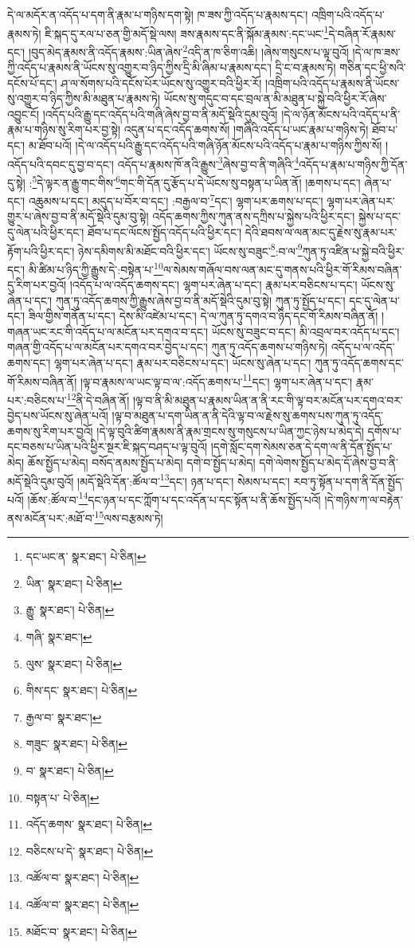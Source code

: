 དེ་ལ་མདོར་ན་འདོད་པ་དག་ནི་རྣམ་པ་གཉིས་དག་སྟེ། ཁ་ཟས་ཀྱི་འདོད་པ་རྣམས་དང་། འཁྲིག་པའི་འདོད་པ་རྣམས་ཏེ། ཇི་སྐད་དུ་རལ་པ་ཅན་གྱི་མདོ་སྡེ་ལས། ཟས་རྣམས་དང་ནི་སྐོམ་རྣམས་:དང་ཡང་\footnote{དང་ཡང་ན་  སྣར་ཐང་།  པེ་ཅིན། }དེ་བཞིན་རོ་རྣམས་དང་། །བུད་མེད་རྣམས་ནི་འདོད་རྣམས་:ཡིན་ཞེས་\footnote{ཡིན་  སྣར་ཐང་།  པེ་ཅིན། }འདི་ན་ཁ་ཅིག་འཆི། །ཞེས་གསུངས་པ་ལྟ་བུའོ། །དེ་ལ་ཁ་ཟས་ཀྱི་འདོད་པ་རྣམས་ནི་ཡོངས་སུ་འགྱུར་བ་ཉིད་ཀྱིས་དྲི་མི་ཞིམ་པ་རྣམས་དང་། དྲི་ང་བ་རྣམས་ཏེ། གཅིན་དང་ཕྱི་སའི་དངོས་པོ་དང་། ཤ་ལ་སོགས་པའི་དངོས་པོར་ཡོངས་སུ་འགྱུར་བའི་ཕྱིར་རོ། །འཁྲིག་པའི་འདོད་པ་རྣམས་ནི་ཡོངས་སུ་འགྱུར་བ་ཉིད་ཀྱིས་མི་མཐུན་པ་རྣམས་ཏེ། ཡོངས་སུ་གདུང་བ་དང་བྲལ་ན་མི་མཐུན་པ་སྐྱེ་བའི་ཕྱིར་རོ་ཞེས་འབྱུང་ངོ། །འདོད་པའི་རྒྱུ་དང་འདོད་པའི་གཞི་ཞེས་བྱ་བ་ནི་མདོ་སྡེའི་དུམ་བུའོ། །དེ་ལ་ཉོན་མོངས་པའི་འདོད་པ་ནི་རྣམ་པ་གཉིས་སུ་རིག་པར་བྱ་སྟེ། འདུན་པ་དང་འདོད་ཆགས་སོ། །གཞིའི་འདོད་པ་ཡང་རྣམ་པ་གཉིས་ཏེ། ཐོབ་པ་དང་། མ་ཐོབ་པའོ། །དེ་ལ་འདོད་པའི་རྒྱུ་དང་འདོད་པའི་གཞི་ཉོན་མོངས་པའི་འདོད་པ་རྣམ་པ་གཉིས་ཀྱིས་སོ། །འདོད་པའི་དབང་དུ་བྱ་བ་དང་། འདོད་པ་རྣམས་ཁོ་ནའི་རྒྱུས་\footnote{རྒྱུ་  སྣར་ཐང་།  པེ་ཅིན། }ཞེས་བྱ་བ་ནི་གཞིའི་\footnote{གཞི་  སྣར་ཐང་། }འདོད་པ་རྣམ་པ་གཉིས་ཀྱི་དོན་དུ་སྟེ། :\footnote{ལུས་  སྣར་ཐང་།  པེ་ཅིན། }དེ་ལྟར་ན་རྒྱུ་གང་གིས་\footnote{གིས་དང་  སྣར་ཐང་།  པེ་ཅིན། }གང་གི་དོན་དུ་རྩོད་པ་དེ་ཡོངས་སུ་བསྟན་པ་ཡིན་ནོ། །ཆགས་པ་དང་། ཞེན་པ་དང་། འཆུམས་པ་དང་། མདུད་པ་བོར་བ་དང་། :བརྒྱལ་བ་\footnote{རྒྱལ་བ་  སྣར་ཐང་། }དང་། ལྷག་པར་ཆགས་པ་དང་། ལྷག་པར་ཞེན་པར་གྱུར་པ་ཞེས་བྱ་བ་ནི་མདོ་སྡེའི་དུམ་བུ་སྟེ། འདོད་ཆགས་ཀྱིས་ཀུན་ནས་དཀྲིས་པ་སྐྱེས་པའི་ཕྱིར་དང་། སྐྱེས་པ་དང་དུ་ལེན་པའི་ཕྱིར་དང་། ཐོབ་པ་དང་ལོངས་སྤྱོད་འདོད་པའི་ཕྱིར་དང་། དེའི་ཐབས་ལ་ལན་མང་དུ་རྗེས་སུ་རྣམ་པར་རྟོག་པའི་ཕྱིར་དང་། ཉེས་དམིགས་མི་མཐོང་བའི་ཕྱིར་དང་། ཡོངས་སུ་བཟུང་\footnote{གཟུང་  སྣར་ཐང་།  པེ་ཅིན། }:བ་ལ་\footnote{བ་  སྣར་ཐང་།  པེ་ཅིན། }ཀུན་ཏུ་འཛིན་པ་སྐྱེ་བའི་ཕྱིར་དང་། མི་ཚིམ་པ་ཉིད་ཀྱི་རྒྱུས་དེ་:བསྟེན་པ་\footnote{བསྟན་པ་  པེ་ཅིན། }ལ་སེམས་གཞོལ་བས་ལན་མང་དུ་གནས་པའི་ཕྱིར་གོ་རིམས་བཞིན་དུ་རིག་པར་བྱའོ། །འདོད་པ་ལ་འདོད་ཆགས་དང་། ལྷག་པར་ཞེན་པ་དང་། རྣམ་པར་བཅིངས་པ་དང་། ཡོངས་སུ་ཞེན་པ་དང་། ཀུན་ཏུ་འདོད་ཆགས་ཀྱི་རྒྱུས་ཞེས་བྱ་བ་ནི་མདོ་སྡེའི་དུམ་བུ་སྟེ། ཀུན་ཏུ་སྤྱོད་པ་དང་། དང་དུ་ལེན་པ་དང་། ཟིལ་གྱིས་གནོན་པ་དང་། དེས་མི་འཛེམ་པ་དང་། དེ་ལ་ཀུན་ཏུ་དགའ་བ་ཉིད་དང་གོ་རིམས་བཞིན་ནོ། །གཞན་ཡང་རང་གི་འདོད་པ་ལ་མངོན་པར་དགའ་བ་དང་། ཡོངས་སུ་བཟུང་བ་དང་། མི་འབྲལ་བར་འདོད་པ་དང་། གཞན་གྱི་འདོད་པ་ལ་མངོན་པར་དགའ་བར་བྱེད་པ་དང་། ཀུན་ཏུ་འདོད་ཆགས་པ་གཉིས་ཏེ། འདོད་པ་ལ་འདོད་ཆགས་དང་། ལྷག་པར་ཞེན་པ་དང་། རྣམ་པར་བཅིངས་པ་དང་། ཡོངས་སུ་ཞེན་པ་དང་། ཀུན་ཏུ་འདོད་ཆགས་དང་གོ་རིམས་བཞིན་ནོ། །ལྟ་བ་རྣམས་ལ་ཡང་ལྟ་བ་ལ་:འདོད་ཆགས་པ་\footnote{འདོད་ཆགས་  སྣར་ཐང་།  པེ་ཅིན། }དང་། ལྷག་པར་ཞེན་པ་དང་། རྣམ་པར་:བཅིངས་པ་\footnote{བཅིངས་པ་དེ་  སྣར་ཐང་།  པེ་ཅིན། }ནི་དེ་བཞིན་ནོ། །ལྟ་བ་ནི་མི་མཐུན་པ་རྣམས་ཡིན་ན་ནི་རང་གི་ལྟ་བར་མངོན་པར་དགའ་བར་བྱེད་པས་ཡོངས་སུ་ཞེན་པའོ། །ལྟ་བ་མཐུན་པ་དག་ཡིན་ན་ནི་དེའི་ལྟ་བ་ལ་རྗེས་སུ་ཆགས་པས་ཀུན་ཏུ་འདོད་ཆགས་སུ་རིག་པར་བྱའོ། །དེ་ལྟ་བུའི་ཚིག་རྣམས་ནི་རྣམ་གྲངས་སུ་གསུངས་པ་ཡིན་ཀྱང་ཉེས་པ་མེད་དེ། དགོས་པ་དང་བཅས་པ་ཡིན་པའི་ཕྱིར་སྔར་ཇི་སྐད་བཤད་པ་ལྟ་བུའོ། །དགེ་སློང་དག་སེམས་ཅན་དེ་དག་ལ་ནི་དོན་སྤྱོད་པ་མེད། ཆོས་སྤྱོད་པ་མེད། བསོད་ནམས་སྤྱོད་པ་མེད། དགེ་བ་སྤྱོད་པ་མེད། དགེ་ལེགས་སྤྱོད་པ་མེད་དོ་ཞེས་བྱ་བ་ནི་མདོ་སྡེའི་དུམ་བུའོ། །མདོ་སྡེའི་དོན་:ཚོལ་བ་\footnote{འཚོལ་བ་  སྣར་ཐང་།  པེ་ཅིན། }དང་། ཉན་པ་དང་། སེམས་པ་དང་། རབ་ཏུ་སྟོན་པ་དག་ནི་དོན་སྤྱོད་པའོ། །ཆོས་:ཚོལ་བ་\footnote{འཚོལ་བ་  སྣར་ཐང་།  པེ་ཅིན། }དང་ཉན་པ་དང་ཀློག་པ་དང་འདོན་པ་དང་སྟོན་པ་ནི་ཆོས་སྤྱོད་པའོ། །དེ་གཉིས་ཀ་ལ་བརྟེན་ནས་མངོན་པར་:མཐོ་བ་\footnote{མཐོང་བ་  སྣར་ཐང་།  པེ་ཅིན། }ལས་བརྩམས་ཏེ། 
